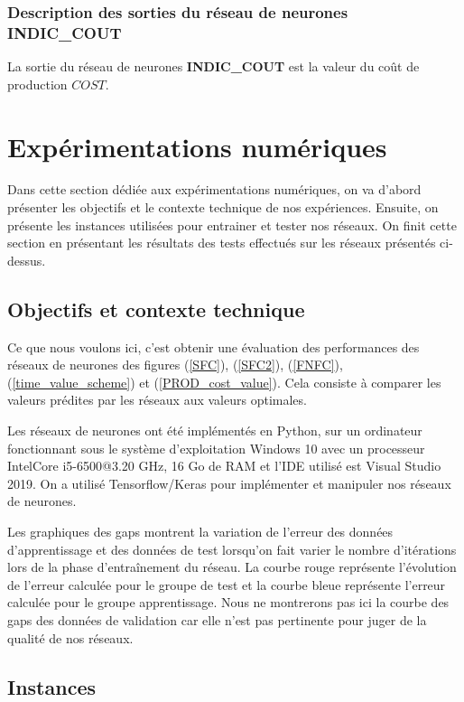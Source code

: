\subsubsection{Description des sorties du réseau de neurones \textbf{INDIC\_COUT}}
La sortie du réseau de neurones \textbf{INDIC\_COUT} est la valeur du coût de production $COST$.

\section{Expérimentations numériques}
\label{RN_exp}
Dans cette section dédiée aux expérimentations numériques, on va d'abord présenter les objectifs et le contexte technique de nos expériences. Ensuite, on présente les instances utilisées pour entrainer et tester nos réseaux. On finit cette section en présentant les résultats des tests effectués sur les réseaux présentés ci-dessus.
\subsection{Objectifs et contexte technique}

Ce que nous voulons ici, c'est obtenir une évaluation des performances des réseaux de neurones des figures (\ref{SFC}), (\ref{SFC2}), (\ref{FNFC}), (\ref{time_value_scheme}) et (\ref{PROD_cost_value}). Cela consiste à comparer les valeurs prédites par les réseaux aux valeurs optimales.

Les réseaux de neurones ont été implémentés en Python, sur un ordinateur fonctionnant sous le système d'exploitation Windows 10 avec un processeur IntelCore i5-6500@3.20 GHz, 16 Go de RAM et l'IDE utilisé est Visual Studio 2019. On a utilisé Tensorflow/Keras pour implémenter et manipuler nos réseaux de neurones. 

Les graphiques des gaps montrent la variation de l'erreur des données d'apprentissage et des données de test lorsqu'on fait varier le nombre d'itérations lors de la phase d'entraînement du réseau. La courbe rouge représente l'évolution de l'erreur calculée pour le groupe de test et la courbe bleue représente l'erreur calculée pour le groupe apprentissage. Nous ne montrerons pas ici la courbe des gaps des données de validation car elle n'est pas pertinente pour juger de la qualité de nos réseaux.


\subsection{Instances}

